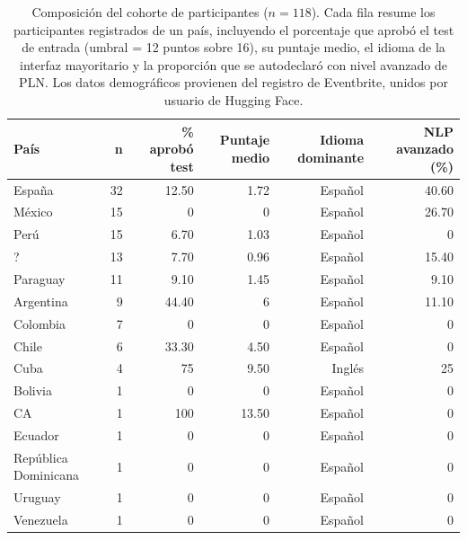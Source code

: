 \begin{table}[ht]
    \centering
    \caption{Composición del cohorte de participantes ($n=118$). Cada fila resume los participantes registrados de un país, incluyendo el porcentaje que aprobó el test de entrada (umbral = 12 puntos sobre 16), su puntaje medio, el idioma de la interfaz mayoritario y la proporción que se autodeclaró con nivel avanzado de PLN. Los datos demográficos provienen del registro de Eventbrite, unidos por usuario de Hugging Face.}
    \label{tab:participantes}
    \begin{tabular}{lrrrrr}
    \toprule
    País & n & \% aprobó test & Puntaje medio & Idioma dominante & NLP avanzado (\%) \\
    \midrule
    España & 32 & 12.50 & 1.72 & Español & 40.60 \\
    México & 15 & 0 & 0 & Español & 26.70 \\
    Perú & 15 & 6.70 & 1.03 & Español & 0 \\
    ? & 13 & 7.70 & 0.96 & Español & 15.40 \\
    Paraguay & 11 & 9.10 & 1.45 & Español & 9.10 \\
    Argentina & 9 & 44.40 & 6 & Español & 11.10 \\
    Colombia & 7 & 0 & 0 & Español & 0 \\
    Chile & 6 & 33.30 & 4.50 & Español & 0 \\
    Cuba & 4 & 75 & 9.50 & Inglés & 25 \\
    Bolivia & 1 & 0 & 0 & Español & 0 \\
    CA & 1 & 100 & 13.50 & Español & 0 \\
    Ecuador & 1 & 0 & 0 & Español & 0 \\
    República Dominicana & 1 & 0 & 0 & Español & 0 \\
    Uruguay & 1 & 0 & 0 & Español & 0 \\
    Venezuela & 1 & 0 & 0 & Español & 0 \\
    \bottomrule
    \end{tabular}
\end{table}
